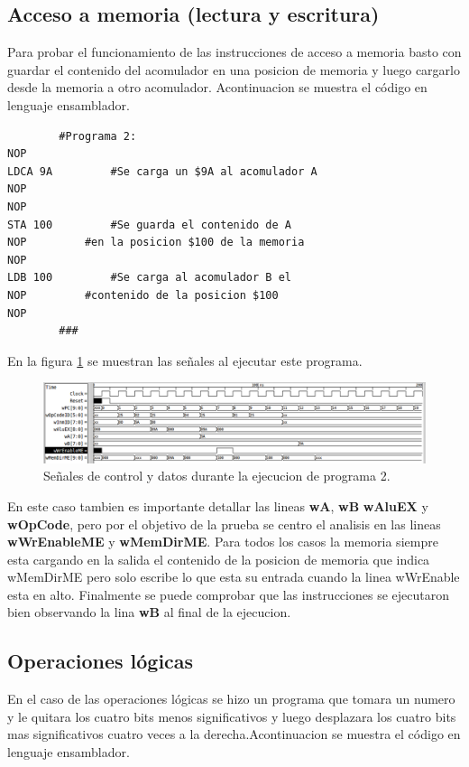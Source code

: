 \documentclass[paper=letter, fontsize=12pt]{article}
\begin{document}
\subsection{Acceso a memoria (lectura y escritura)}

Para probar el funcionamiento de las instrucciones de acceso a memoria basto con guardar el contenido del acomulador en una posicion de memoria y luego cargarlo desde la memoria a otro acomulador. Acontinuacion se muestra el código en lenguaje ensamblador.

\begin{lstlisting}
		#Programa 2:
NOP
LDCA 9A			#Se carga un $9A al acomulador A
NOP
NOP
STA 100			#Se guarda el contenido de A 
NOP			#en la posicion $100 de la memoria
NOP
LDB 100			#Se carga al acomulador B el 
NOP			#contenido de la posicion $100
NOP
		###
\end{lstlisting}

En la figura \ref{i:p2} se muestran las señales al ejecutar este programa.\\

\begin{figure}[hbtp]
\centering
\includegraphics[width=1\linewidth]{../test/Prog2.png}
\caption{Señales de control y datos durante la ejecucion de programa 2.}
\label{i:p2}
\end{figure}

En este caso tambien es importante detallar las lineas \textbf{wA}, \textbf{wB} \textbf{wAluEX} y \textbf{wOpCode}, pero por el objetivo de la prueba se centro el analisis en las lineas \textbf{wWrEnableME} y \textbf{wMemDirME}. Para todos los casos la memoria siempre esta cargando en la salida el contenido de la posicion de memoria que indica wMemDirME pero solo escribe lo que esta su entrada cuando la linea wWrEnable esta en alto. Finalmente se puede comprobar que las instrucciones se ejecutaron bien observando la lina \textbf{wB} al final de la ejecucion.

\subsection{Operaciones lógicas}

En el caso de las operaciones lógicas se hizo un programa que tomara un numero y le quitara los cuatro bits menos significativos y luego desplazara los cuatro bits mas significativos cuatro veces a la derecha.Acontinuacion se muestra el código en lenguaje ensamblador.
\end{document}
